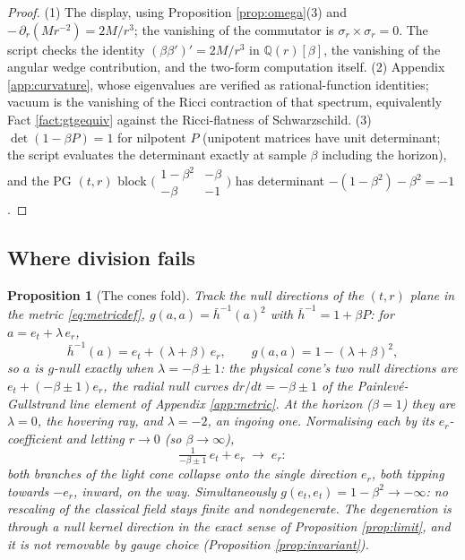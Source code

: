 \documentclass[11pt]{article}
\newtheorem{proposition}[theorem]{Proposition}
\theoremstyle{definition}
\newcommand{\hb}{\bar{h}}
\newcommand{\er}{e_r}
\newcommand{\et}{e_t}
\begin{document}
\begin{proof}
(1) The display, using Proposition \ref{prop:omega}(3) and $-\,\partial_r(Mr^{-2}) = 2M/r^3$; the vanishing of the commutator is $\sigma_r \times \sigma_r = 0$. The script checks the identity $(\beta\beta')' = 2M/r^3$ in $\mathbb{Q}(r)[\beta]$, the vanishing of the angular wedge contribution, and the two-form computation itself. (2) Appendix \ref{app:curvature}, whose eigenvalues are verified as rational-function identities; vacuum is the vanishing of the Ricci contraction of that spectrum, equivalently Fact \ref{fact:gtgequiv} against the Ricci-flatness of Schwarzschild. (3) $\det(1 - \beta P) = 1$ for nilpotent $P$ (unipotent matrices have unit determinant; the script evaluates the determinant exactly at sample $\beta$ including the horizon), and the PG $(t,r)$ block $\bigl(\begin{smallmatrix} 1-\beta^2 & -\beta \\ -\beta & -1 \end{smallmatrix}\bigr)$ has determinant $-(1-\beta^2) - \beta^2 = -1$.
\end{proof}

\subsection{Where division fails}\label{subsec:fails}

\begin{proposition}[The cones fold]\label{prop:fold}
Track the null directions of the $(t,r)$ plane in the metric \eqref{eq:metricdef}, $g(a,a) = \hb^{-1}(a)^{2}$ with $\hb^{-1} = 1 + \beta P$: for $a = \et + \lambda\,\er$,
\[
\hb^{-1}(a) = \et + (\lambda + \beta)\,\er, \qquad g(a,a) = 1 - (\lambda + \beta)^2 ,
\]
so $a$ is $g$-null exactly when $\lambda = -\beta \pm 1$: the physical cone's two null directions are $\et + (-\beta \pm 1)\er$, the radial null curves $dr/dt = -\beta \pm 1$ of the Painlev\'e-Gullstrand line element of Appendix \ref{app:metric}. At the horizon ($\beta = 1$) they are $\lambda = 0$, the hovering ray, and $\lambda = -2$, an ingoing one. Normalising each by its $\er$-coefficient and letting $r \to 0$ (so $\beta \to \infty$),
\[
\tfrac{1}{-\beta \pm 1}\,\et + \er \;\longrightarrow\; \er :
\]
both branches of the light cone collapse onto the single direction $\er$, both tipping towards $-\er$, inward, on the way. Simultaneously $g(\et, \et) = 1 - \beta^2 \to -\infty$: no rescaling of the classical field stays finite and nondegenerate. The degeneration is through a null kernel direction in the exact sense of Proposition \ref{prop:limit}, and it is not removable by gauge choice (Proposition \ref{prop:invariant}).
\end{proposition}
\end{document}
